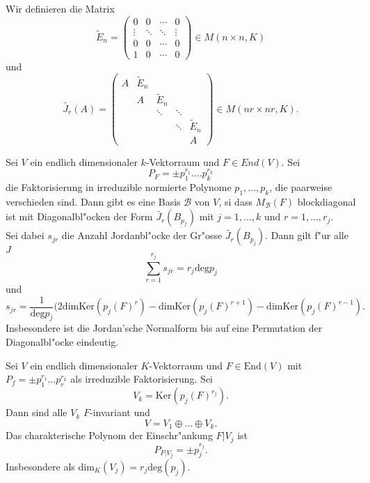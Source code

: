 \documentclass[9pt, a4paper, twocolumn, landscape]{article}
\begin{document}
{ \begin{definition}
 Wir definieren die Matrix
 $$
 \tilde{E}_n =
\left(\begin{array}{cccc}0 & 0 & \cdots & 0 \\ \vdots & \ddots & \ddots & \vdots \\ 0 & 0 & \cdots & 0 \\ 1 & 0 & \cdots & 0\end{array}\right) \in M(n \times n, K)
 $$
 und 
 $$
 \tilde{J_r}(A)
=\left(\begin{array}{ccccc}A & \tilde{E}_{n} & & & \\ & A & \tilde{E}_{n} & & \\ & & \ddots & \ddots & \\ & & & \ddots & \tilde{E}_{n} \\ & & & & A\end{array}\right) \in M(n r \times n r, K).
 $$
 \end{definition}
 
 
 \begin{theorem}
 Sei $V$ ein endlich dimensionaler $k$-Vektorraum und $F \in End(V)$. Sei
 $$
 P_F = \pm p_1^{r_1} .... p_k^{r_k}
 $$
 die Faktorisierung in irreduzible normierte Polynome $p_1, ..., p_k$, die paarweise verschieden sind. Dann gibt es eine Basis $\mathcal{B}$ von $V$, si dass $M_\mathcal{B}(F)$ blockdiagonal ist mit Diagonalbl"ocken der Form $\tilde{J_r}(B_{p_f})$ mit $j = 1, ..., k$ und $r = 1, ..., r_j$.
 \\ Sei dabei $s_{jr}$ die Anzahl Jordanbl"ocke der Gr"osse $\tilde{J_r}(B_{p_j})$. 
 Dann gilt f"ur alle $J$
 $$
 \sum\limits_{r = 1}^{r_j} s_{jr} = r_j \mathrm{deg} p_j
 $$
 und 
 $$
 s_{jr} = \frac{1}{\mathrm{deg}  p_j}(2 \mathrm{dim} \mathrm{Ker} (p_j(F)^r) -\mathrm{dim} \mathrm{Ker}(p_j(F)^{r+1}) - \mathrm{dim} \mathrm{Ker}(p_j(F)^{r-1}).
 $$
 Insbesondere ist die Jordan'sche Normalform bis auf eine Permutation der Diagonalbl"ocke eindeutig.
  
 \end{theorem}
 
 \begin{theorem}
 Sei $V$ ein endlich dimensionaler $K$-Vektorraum und $F \in \mathrm{End}(V)$ mit $P_f = \pm p_1^{r_1} ... p_r^{r_k}$ als irreduzible Faktorisierung. Sei 
 $$
 V_k = \mathrm{Ker}(p_j(F)^{r_j}).
 $$
 Dann sind alle $V_k$ $F$-invariant und
 $$
 V = V_1 \oplus ... \oplus V_k.
 $$
 Das charakterische Polynom der Einschr"ankung $F|V_j$ ist
 $$
 P_{F|V_j} = \pm p_j^{r_j}.
 $$
 Insbesondere als $\mathrm{dim}_K(V_j) = r_j \mathrm{deg}(p_j)$.
 \end{theorem}
 
 }
 
\end{document}
